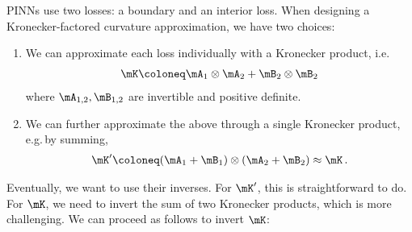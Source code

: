 PINNs use two losses: a boundary and an interior loss.
When designing a Kronecker-factored curvature approximation, we have two choices:
\begin{enumerate}
\item We can approximate each loss individually with a Kronecker product, i.e.
  \begin{align*}
    \mK \coloneq \mA_1 \otimes \mA_2 + \mB_2 \otimes \mB_2
  \end{align*}
  where $\mA_{1,2}, \mB_{1,2}$ are invertible and positive definite.

\item We can further approximate the above through a single Kronecker product, e.g.\,by summing,
  \begin{align*}
    \mK' \coloneq (\mA_1 + \mB_1) \otimes (\mA_2 + \mB_2) \approx \mK\,.
  \end{align*}
\end{enumerate}
Eventually, we want to use their inverses.
For $\mK'$, this is straightforward to do.
For $\mK$, we need to invert the sum of two Kronecker products, which is more challenging.
We can proceed as follows to invert $\mK$:
